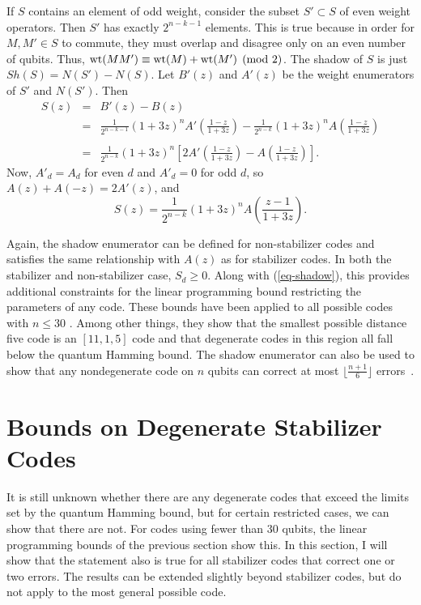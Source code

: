 If $S$ contains an element of odd weight, consider the subset $S' \subset
S$ of even weight operators.  Then $S'$ has exactly $2^{n-k-1}$ elements.
This is true because in order for $M, M' \in S$ to commute, they must overlap
and disagree only on an even number of qubits.  Thus, ${\rm wt}(MM') \equiv
{\rm wt}(M) + {\rm wt}(M') \pmod{2}$.
The shadow of $S$ is just $Sh(S) = N(S') - N(S)$.  Let $B'(z)$ and $A'(z)$ be
the weight enumerators of $S'$ and $N(S')$.  Then
\begin{eqnarray}
	S(z) & = & B' (z) - B(z) \\
	& = & \frac{1}{2^{n-k-1}} (1+3z)^n A' \left( \frac{1-z}{1+3z} \right) -
	\frac{1}{2^{n-k}} (1+3z)^n A \left( \frac{1-z}{1+3z} \right) \nonumber \\ \\
	& = & \frac{1}{2^{n-k}} (1+3z)^n \left[ 2 A' \left( \frac{1-z}{1+3z} \right) -
	A \left( \frac{1-z}{1+3z} \right) \right].
\end{eqnarray}
Now, $A'_d = A_d$ for even $d$ and $A'_d = 0$ for odd $d$, so $A(z) + A(-
z) = 2 A'(z)$, and
\begin{equation}
	S(z) = \frac{1}{2^{n-k}} (1+3z)^n A \left( \frac{z-1}{1+3z} \right).
\end{equation}

Again, the shadow enumerator can be defined for non-stabilizer codes and
satisfies the same relationship with $A(z)$ as for stabilizer codes.  In both
the stabilizer and non-stabilizer case, $S_d \geq 0$.  Along with
(\ref{eq-shadow}), this provides additional constraints for the linear
programming bound restricting the parameters of any code.  These bounds
have been applied to all possible codes with $n \leq 30$
\cite{rains-shadow,calderbank-GF4}.  Among other things, they show that
the smallest possible distance five code is an $[11,1,5]$ code and that
degenerate codes in this region all fall below the quantum Hamming
bound.  The shadow enumerator can also be used to show that any nondegenerate
code on $n$ qubits can correct at most $\lfloor \frac{n+1}{6} \rfloor$
errors~\cite{rains-shadow}.

\section{Bounds on Degenerate Stabilizer Codes}

It is still unknown whether there are any degenerate codes that exceed the
limits set by the quantum Hamming bound, but for certain restricted cases,
we can show that there are not.  For codes using fewer than 30 qubits, the
linear programming bounds of the previous section show this.  In this
section, I will show that the statement also is true for all stabilizer codes
that correct one or two errors.  The results can be extended slightly
beyond stabilizer codes, but do not apply to the most general possible code.

